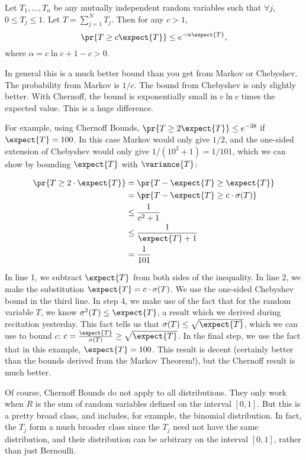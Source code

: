 \begin{theorem}
\label{th:chernoff}
Let $T_1, \ldots, T_n$ be any mutually independent random variables such that $\forall j$, $0 \leq T_j \leq 1$. Let 
$T = \sum_{j=1}^N T_j$. Then for any $c > 1$, 
$$\pr{T \geq c \expect{T}} \leq e^{-\alpha \expect{T}},$$
where $\alpha = c\ln c + 1 - c > 0$.
\end{theorem}
In general this is a much better bound than you get from Markov or Chebyshev. 
The probability from Markov is $1/c$. The bound from Chebyshev is only 
slightly better. With Chernoff, the bound is exponentially small in $c\ln c$ 
times the expected value. This is a huge difference. 

For example, using Chernoff Bounds, $\pr{T \geq 2 \expect{T}} \leq
e^{-38}$ if $\expect{T} = 100$. In this case Markov would only give $1/2$,
and the one-sided extension of Chebyshev would only give $1/(10^2 +1) =
1/101$, which we can show by bounding $\expect{T}$ with $\variance{T}$:

\begin{align}
\pr{T\geq 2\cdot\expect{T}}
& = \pr{T-\expect{T}\geq \expect{T}}\\
& = \pr{T-\expect{T}\geq c\cdot\sigma(T)}\\
& \leq\frac{1}{c^2+1}\\
& \leq\frac{1}{\expect{T}+1}\\
& =\frac{1}{101}\\
\end{align}

In line 1, we subtract $\expect{T}$ from both sides of the
inequality. In line 2, we make the substitution $\expect{T}=c\cdot
\sigma(T)$. We use the one-sided Chebyshev bound in the third line. In
step 4, we make use of the fact that for the random variable $T$, we
know $\sigma^2(T)\leq\expect{T}$, a result which we derived during
recitation yesterday. This fact tells us that
$\sigma(T)\leq\sqrt{\expect{T}}$, which we can use to bound $c$: $c =
\frac{\expect{T}}{\sigma(T)} \geq \sqrt{\expect{T}}$. In the final
step, we use the fact that in this example, $\expect{T}=100$. This
result is decent (certainly better than the bounds derived from the
Markov Theorem!), but the Chernoff result is much better.

Of course, Chernoff Bounds do not apply to all distributions. They only work when $R$ is the sum of random variables defined on the interval $[0,1]$. But this is a pretty broad class, and includes, for example, the binomial distribution. In fact, the $T_j$ form a much broader class since the $T_j$ need not have the same distribution, and their distribution can be arbitrary on the interval $[0,1]$, rather than just Bernoulli. 

